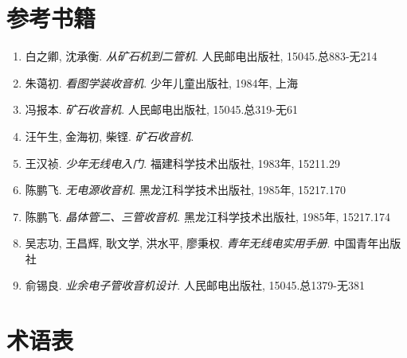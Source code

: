 \documentclass[12pt,UTF8]{ctexbook}
\begin{document}
\backmatter

\chapter{参考书籍}

\begin{enumerate}[leftmargin=3.5em]
    \item 白之卿, 沈承衡. \textit{从矿石机到二管机}. 人民邮电出版社, 15045.总883-无214
    \item 朱蔼初. \textit{看图学装收音机}. 少年儿童出版社, 1984年, 上海
    \item 冯报本. \textit{矿石收音机}. 人民邮电出版社, 15045.总319-无61
    \item 汪午生, 金海初, 柴铿. \textit{矿石收音机}. 
    \item 王汉祯. \textit{少年无线电入门}. 福建科学技术出版社, 1983年, 15211.29
    \item 陈鹏飞. \textit{无电源收音机}. 黑龙江科学技术出版社, 1985年, 15217.170
    \item 陈鹏飞. \textit{晶体管二、三管收音机}. 黑龙江科学技术出版社, 1985年, 15217.174
    \item 吴志功, 王昌辉, 耿文学, 洪水平, 廖秉权. \textit{青年无线电实用手册}. 中国青年出版社
    \item 俞锡良. \textit{业余电子管收音机设计}. 人民邮电出版社, 15045.总1379-无381
\end{enumerate}

\chapter{术语表}
\end{document}
